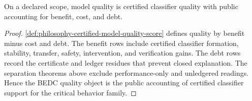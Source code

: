 \begin{theorem}
\label{thm:philosophy-certified-model-quality-theorem}
On a declared scope, model quality is certified classifier quality with
public accounting for benefit, cost, and debt.
\end{theorem}
\begin{proof}
\autoref{def:philosophy-certified-model-quality-score} defines quality
by benefit minus cost and debt. The benefit rows include certified
classifier formation, stability, transfer, safety, intervention, and
verification gains. The debt rows record the certificate and ledger
residues that prevent closed explanation. The separation theorems above
exclude performance-only and unledgered readings. Hence the BEDC quality
object is the public accounting of certified classifier support for the
critical behavior family.
\end{proof}
